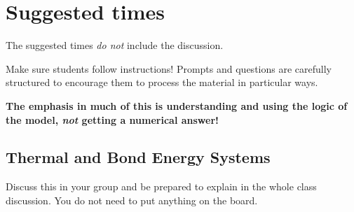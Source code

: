 {    \section*{Suggested times}
    	
    The suggested times {\em do not} include the \WC{} discussion.

    Make sure students follow instructions! Prompts and questions are carefully structured to encourage them to process the material in particular ways.

  \textbf{
    The emphasis in much of this \DL{} is understanding and using the logic of the model, {\em not} getting a numerical answer!
	}
}     	

\subsection{Thermal and Bond Energy Systems}
\label{act1.2.2}

\begin{FNTenv}
	
\end{FNTenv}


\noindent Discuss this \FNT{} in your group and be prepared to explain in the whole class discussion. You do not need to put anything on the board.

\WCD

\begin{FNTenv}
	
\end{FNTenv}

